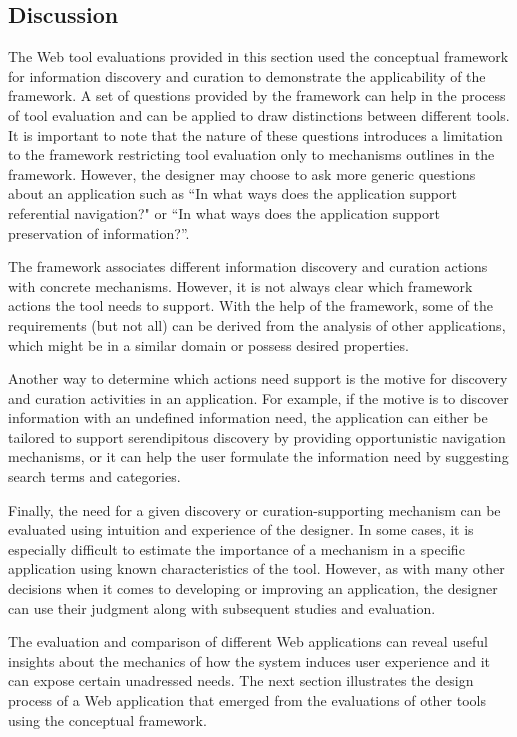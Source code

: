 \documentclass{sigchi}
\begin{document}
{\subsection{Discussion}
The Web tool evaluations provided in this section used the conceptual framework for information discovery and curation to demonstrate the applicability of the framework. A set of questions provided by the framework can help in the process of tool evaluation and can be applied to draw distinctions between different tools. It is important to note that the nature of these questions introduces a limitation to the framework restricting tool evaluation only to mechanisms outlines in the framework. However, the designer  may choose to ask more generic questions about an application such as ``In what ways does the application support referential navigation?" or ``In what ways does the application support preservation of information?''.

The framework associates different information discovery and curation actions with concrete mechanisms. However, it is not always clear which framework actions the tool needs to support. With the help of the framework, some of the requirements (but not all) can be derived from the analysis of other applications, which might be in a similar domain or possess desired properties. 

Another way to determine which actions need support is the motive for discovery and curation activities in an application. For example, if the motive is to discover information with an undefined information need, the application  can either be tailored to support serendipitous discovery by providing opportunistic navigation mechanisms, or it can help the user formulate the information need by suggesting search terms and categories.

Finally, the need for a given discovery or curation-supporting mechanism can be evaluated using intuition and experience of the designer. In some cases, it is especially difficult to estimate the importance of a mechanism in a specific application using known characteristics of the tool. However, as with many other decisions when it comes to developing or improving an application, the designer can use their judgment along with subsequent studies and evaluation. 

The evaluation and comparison of different Web applications can reveal useful insights about the mechanics of how the system induces user experience and it can expose certain unadressed needs. The next section illustrates the design process of a Web application that emerged from the evaluations of other tools using the conceptual framework. 

} %
\end{document}
